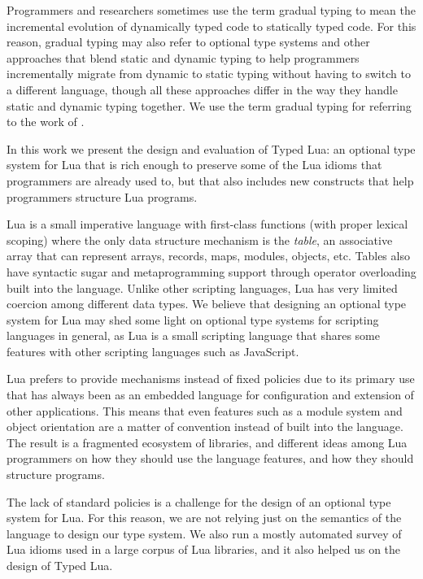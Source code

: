 Programmers and researchers sometimes use the term gradual typing
to mean the incremental evolution of dynamically typed code to
statically typed code.
For this reason, gradual typing may also refer to optional type
systems and other approaches that blend static and dynamic typing to
help programmers incrementally migrate from dynamic to static typing
without having to switch to a different language, though all these
approaches differ in the way they handle static and dynamic typing
together.
We use the term gradual typing for referring to the work of
\citet{siek2006gradual}.

In this work we present the design and evaluation of Typed Lua:
an optional type system for Lua that is rich enough to
preserve some of the Lua idioms that programmers are already used to,
but that also includes new constructs that help programmers
structure Lua programs.

Lua is a small imperative language with first-class functions
(with proper lexical scoping) where the only data structure
mechanism is the \emph{table}, an associative array that can
represent arrays, records, maps, modules, objects, etc.
Tables also have syntactic sugar and metaprogramming support
through operator overloading built into the language.
Unlike other scripting languages, Lua has very limited coercion
among different data types.
We believe that designing an optional type system for Lua may
shed some light on optional type systems for scripting languages
in general, as Lua is a small scripting language that shares
some features with other scripting languages such as JavaScript.

Lua prefers to provide mechanisms instead of fixed policies due
to its primary use that has always been as an embedded language
for configuration and extension of other applications.
This means that even features such as a module system and
object orientation are a matter of convention instead of built
into the language.
The result is a fragmented ecosystem of libraries, and different
ideas among Lua programmers on how they should use the language
features, and how they should structure programs.

The lack of standard policies is a challenge for the design of
an optional type system for Lua.
For this reason, we are not relying just on the semantics of
the language to design our type system.
We also run a mostly automated survey of Lua idioms used in a
large corpus of Lua libraries, and it also helped us on the
design of Typed Lua.

